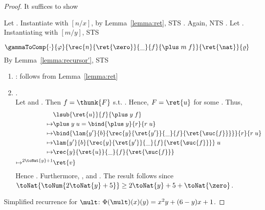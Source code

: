 \begin{proof}
It suffices to show 


Let . Instantiate with $[n/x]$, by Lemma~\ref{lemma:ret}, STS
. Again,
NTS
. Let . Instantiating with $[m/y]$, STS

\[
\gammaToComp{\cdot}{\varphi}{\rec{n}{\ret{\zero}}{\_}{f}{\plus\; m\; f}}{\ret{\nat}}{\varrho}
\]
By Lemma~\ref{lemma:recursor'}, STS
\begin{enumerate}
    \item {}: follows from
    Lemma~\ref{lemma:ret}
    \item {}.\\
    Let  and . 
    Then $f = \thunk{F}$ s.t. . Hence,
    $F = \ret{u}$ for some . Thus,
    \begin{align*}
    &\lsub{\ret{u}}{f}{\plus\; y\; f}\\
    \mapsto& \plus\; y\; u = \bind{\plus\; y}{r}{r\; u}\\
    \mapsto& \bind{\lam{y'}{b}{\rec{y}{\ret{y'}}{\_}{f}{\ret{\suc{f}}}}}{r}{r\; u}\\
    \mapsto& \lam{y'}{b}{\rec{y}{\ret{y'}}{\_}{f}{\ret{\suc{f}}}}\; u\\
    \mapsto& \rec{y}{\ret{u}}{\_}{f}{\ret{\suc{f}}}\\
    \mapsto^{2\toNat{y}+1}& \ret{v}
    \end{align*}
    Hence .
    Furthermore, ,
    and . The result follows since 
    $\toNat{\toNum{2\toNat{y}+5}} \ge 2\toNat{y}+5 + \toNat{\zero}$.
\end{enumerate}

Simplified recurrence for $\mult$: $\Phi(\mult)(x)(y) = x^2y + (6-y)x + 1$.



\end{proof}

